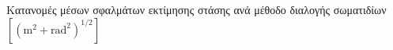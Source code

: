 \begin{frame}{\footnotesize Κατανομές μέσων σφαλμάτων εκτίμησης στάσης ανά μέθοδο διαλογής σωματιδίων $[(\text{m}^2+\text{rad}^2)^{1/2}]$}

  \begin{figure}
    
  \end{figure}
  \vspace{-0.8cm}
  \begin{figure}
    
  \end{figure}


\end{frame}
